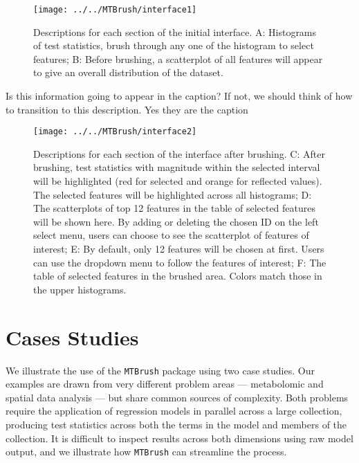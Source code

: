 \begin{Schunk}
\begin{figure}
\texttt{[image: ../../MTBrush/interface1]} \caption[Descriptions for each section of the initial interface]{Descriptions for each section of the initial interface. A: Histograms of test statistics, brush through any one of the histogram to select features;  B: Before brushing, a scatterplot of all features will appear to give an overall distribution of the dataset.}\label{fig:unnamed-chunk-7}
\end{figure}
\end{Schunk}

\color{purple}Is this information going to appear in the caption? If
not, we should think of how to transition to this description. Yes they
are the caption\color{black}

\begin{Schunk}
\begin{figure}
\texttt{[image: ../../MTBrush/interface2]} \caption[Descriptions for each section of the interface after brushing]{Descriptions for each section of the interface after brushing. C: After brushing, test statistics with magnitude within the selected interval will be highlighted (red for selected and orange for reflected values). The selected features will be highlighted across all histograms; D: The scatterplots of top 12 features in the table of selected features will be shown here. By adding or deleting the chosen ID on the left select menu, users can choose to see the scatterplot of features of interest; E: By default, only 12 features will be chosen at first. Users can use the dropdown menu to follow the features of interest; F: The table of selected features in the brushed area. Colors match those in the upper histograms.}\label{fig:unnamed-chunk-8}
\end{figure}
\end{Schunk}

\hypertarget{cases-studies}{%
\section{Cases Studies}\label{cases-studies}}

We illustrate the use of the \texttt{MTBrush} package using two case
studies. Our examples are drawn from very different problem areas ---
metabolomic and spatial data analysis --- but share common sources of
complexity. Both problems require the application of regression models
in parallel across a large collection, producing test statistics across
both the terms in the model and members of the collection. It is
difficult to inspect results across both dimensions using raw model
output, and we illustrate how \texttt{MTBrush} can streamline the
process.

